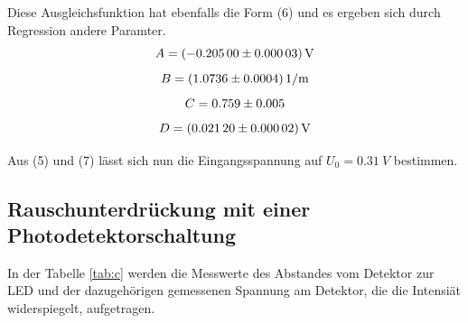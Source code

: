 Diese Ausgleichsfunktion hat ebenfalls die Form (6) und es ergeben sich durch Regression andere Paramter.
\begin{equation}
	A = \SI{-0.20500 \pm 0.00003}{V}\notag
\end{equation}
\begin{equation}
	B = \SI{1.0736 \pm 0.0004}{1/m} \notag
\end{equation}
\begin{equation}
	C = 0.759 \pm 0.005 \notag
\end{equation}
\begin{equation}
	D = \SI{0.02120 \pm 0.00002}{V} \notag
\end{equation}

Aus (5) und (7) lässt sich nun die Eingangsspannung auf $U_0 = \SI{0,31}{V}$ bestimmen.

\subsection{Rauschunterdrückung mit einer Photodetektorschaltung}
In der Tabelle \ref{tab:c} werden die Messwerte des Abstandes vom Detektor zur LED und der dazugehörigen gemessenen Spannung am Detektor, die die Intensiät widerspiegelt, aufgetragen.

